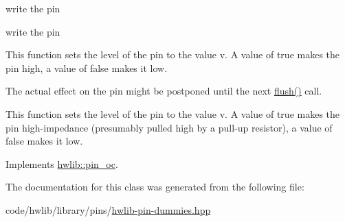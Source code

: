 write the pin

write the pin

This function sets the level of the pin to the value v. A value of true makes the pin high, a value of false makes it low.

The actual effect on the pin might be postponed until the next \hyperlink{classhwlib_1_1pin__oc__dummy__t_ab3eb9b3c0a350944f791adf194e2f9ab}{flush()} call.

This function sets the level of the pin to the value v. A value of true makes the pin high-\/impedance (presumably pulled high by a pull-\/up resistor), a value of false makes it low. 

Implements \hyperlink{classhwlib_1_1pin__oc_a4429dd7dc80858a213bb157f4ac5def3}{hwlib\+::pin\+\_\+oc}.



The documentation for this class was generated from the following file\+:\begin{DoxyCompactItemize}
\item 
code/hwlib/library/pins/\hyperlink{hwlib-pin-dummies_8hpp}{hwlib-\/pin-\/dummies.\+hpp}\end{DoxyCompactItemize}
